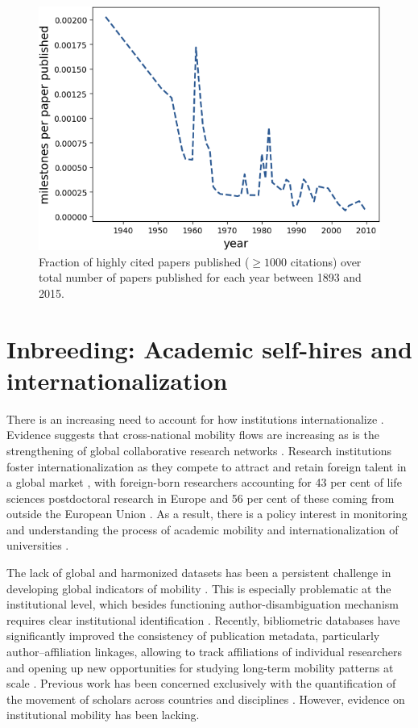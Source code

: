 \documentclass[draft,final]{vutinfth} %
\begin{document}
\begin{figure}[!ht]
	\centering
	 \includegraphics[width=0.7\columnwidth]{figures_aps/10.png}
	\caption{
	Fraction of highly cited papers published ($\geq 1000$ citations) over total number of papers published for each year between 1893 and 2015.
	}
	\label{fig_SI_ms2}
\end{figure}



\chapter{Inbreeding: Academic self-hires and internationalization}

There is an increasing need to account for how institutions internationalize \cite{hoekman2009geography, robinson2019many}. Evidence suggests that cross-national mobility flows are increasing \cite{sugimoto2017scientists} as is the strengthening of global collaborative research networks \cite{wagner2017open}. Research institutions foster internationalization as they compete to attract and retain foreign talent in a global market \cite{hazelkorn2015rankings}, with foreign-born researchers accounting for 43 per cent of life sciences postdoctoral research in Europe and 56 per cent of these coming from outside the European Union \cite{moguerou2008}. As a result, there is a policy interest in monitoring and understanding the process of academic mobility and internationalization of universities \cite{jacob2013scientific, sugimoto2017scientists}.

The lack of global and harmonized datasets has been a persistent challenge in developing global indicators of mobility \cite{welch2018}. This is especially problematic at the institutional level, which besides functioning author-disambiguation mechanism requires clear institutional identification \cite{donner2020comparing}. Recently, bibliometric databases have significantly improved the consistency of publication metadata, particularly author--affiliation linkages, allowing to track affiliations of individual researchers and opening up new opportunities for studying long-term mobility patterns at scale \cite{moed05, sugimoto2016}. Previous work has been concerned exclusively with the quantification of the movement of scholars across countries and disciplines \cite{robinson2019many}. However, evidence on institutional mobility has been lacking.
\end{document}
